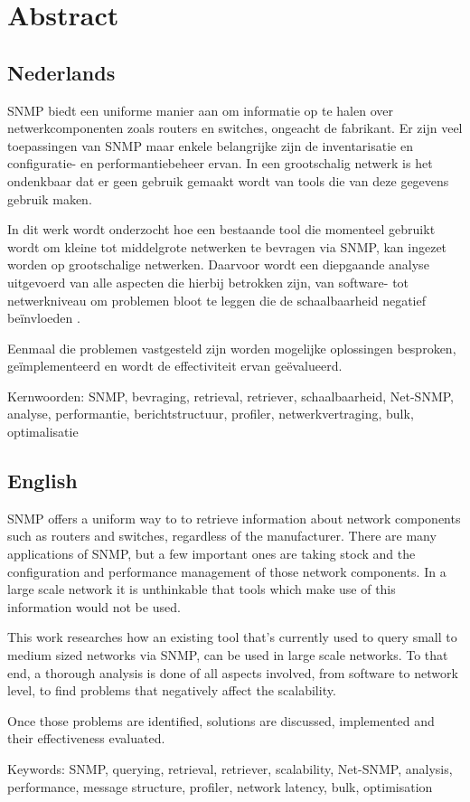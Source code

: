 \chapter*{Abstract}

\section*{Nederlands}

SNMP biedt een uniforme manier aan om informatie op te halen over netwerkcomponenten zoals routers en switches, ongeacht de fabrikant.
Er zijn veel toepassingen van SNMP maar enkele belangrijke zijn de inventarisatie en configuratie- en performantiebeheer ervan.
In een grootschalig netwerk is het ondenkbaar dat er geen gebruik gemaakt wordt van tools die van deze gegevens gebruik maken.

In dit werk wordt onderzocht hoe een bestaande tool die momenteel gebruikt wordt om kleine tot middelgrote netwerken te bevragen via SNMP,
kan ingezet worden op grootschalige netwerken.
Daarvoor wordt een diepgaande analyse uitgevoerd van alle aspecten die hierbij betrokken zijn,
van software- tot netwerkniveau om problemen bloot te leggen die de schaalbaarheid negatief beïnvloeden .

Eenmaal die problemen vastgesteld zijn worden mogelijke oplossingen besproken, geïmplementeerd en wordt de effectiviteit ervan geëvalueerd.


Kernwoorden: SNMP, bevraging, retrieval, retriever, schaalbaarheid, Net-SNMP, analyse, performantie, berichtstructuur, profiler, netwerkvertraging, bulk, optimalisatie


\section*{English}

SNMP offers a uniform way to to retrieve information about network components such as routers and switches, regardless of the manufacturer.
There are many applications of SNMP, but a few important ones are taking stock and the configuration and performance management of those network components.
In a large scale network it is unthinkable that tools which make use of this information would not be used.

This work researches how an existing tool that's currently used to query small to medium sized networks via SNMP,
can be used in large scale networks.
To that end, a thorough analysis is done of all aspects involved, from software to network level, to find problems that negatively affect the scalability.

Once those problems are identified, solutions are discussed, implemented and their effectiveness evaluated.


Keywords: SNMP, querying, retrieval, retriever, scalability, Net-SNMP, analysis, performance, message structure, profiler, network latency, bulk, optimisation